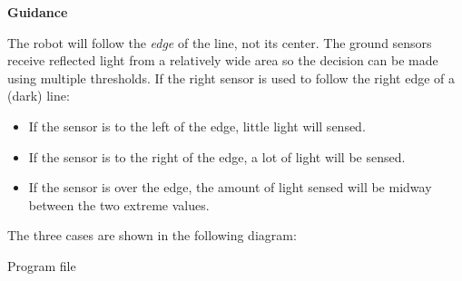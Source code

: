 \textbf{Guidance}

The robot will follow the \emph{edge} of the line, not its center. The ground sensors receive reflected light from a relatively wide area so the decision can be made using multiple thresholds. If the right sensor is used to follow the right edge of a (dark) line:
\begin{itemize}
\item If the sensor is to the left of the edge, little light will sensed.
\item If the sensor is to the right of the edge, a lot of light will be sensed.
\item If the sensor is over the edge, the amount of light sensed will be midway between the two extreme values.
\end{itemize}
The three cases are shown in the following diagram:
\begin{center}
\end{center}

\bigskip

{\raggedleft \hfill Program file }
